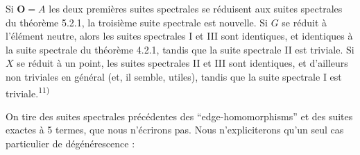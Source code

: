 Si ${\mathbf O}=A$ les deux premières suites spectrales se réduisent aux suites
spectrales du théorème 5.2.1, la troisième suite spectrale est nouvelle. Si
$G$ se réduit à l'élément neutre, alors les suites spectrales I et III sont
identiques, et identiques à la suite spectrale du théorème 4.2.1, tandis que
la suite spectrale II est triviale. Si $X$ se réduit à un point, les suites
spectrales II et III sont identiques, et d'ailleurs non triviales en général
(et, il semble, utiles), tandis que la suite spectrale I est
triviale.\textsuperscript{11)}

On tire des suites spectrales précédentes des ``edge-homomorphisms'' et des
suites exactes à 5 termes, que nous n'écrirons pas.
Nous n'expliciterons qu'un seul cas particulier de dégénérescence :

